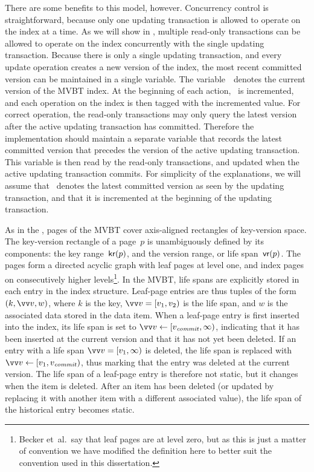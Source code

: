 There are some benefits to this model, however.
Concurrency control is straightforward, because only one updating
transaction is allowed to operate on the index at a time.
As we will show in , multiple read-only
transactions can be allowed to operate on the index concurrently with the
single updating transaction.
Because there is only a single updating transaction, and every update
operation creates a new version of the index, the most recent committed
version can be maintained in a single variable.
The variable~\comver\ denotes the current version of the MVBT index.
At the beginning of each action, \comver\ is incremented, and each operation
on the index is then tagged with the incremented value.
For correct operation, the read-only transactions may only query the
latest version after the active updating transaction has committed.
Therefore the implementation should maintain a separate variable that records
the latest committed version that precedes the version of the active updating
transaction. 
This variable is then read by the read-only transactions, and updated when
the active updating transaction commits. 
For simplicity of the explanations, we will assume that \comver\ denotes the
latest committed version as seen by the updating transaction, and that it is 
incremented at the beginning of the updating transaction.

As in the \TSBtree, pages of the MVBT cover axis-aligned rectangles of
key-version space.
The key-version rectangle of a page~$p$ is unambiguously defined by its
components: the key range~$\text{\textsf{kr}}(p)$\label{def:kr}, and
the version range, or life span~$\text{\textsf{vr}}(p)$\label{def:vr}.
The pages form a directed acyclic graph with leaf pages at level one, and
index pages on consecutively higher levels\footnote{Becker et~al.\ say that
leaf pages are at level zero, but as this is just a matter of convention we
have modified the definition here to better suit the convention used in this
dissertation.}.
In the MVBT, life spans are explicitly stored in each entry in the index
structure.
Leaf-page entries are thus tuples of the form $(k, \vrmark{v}, w)$, where 
$k$ is the key, $\vrmark{v} = [v_1, v_2)$ is the life span, and $w$ is the
associated data stored in the data item.
When a leaf-page entry is first inserted into the index, its life span is set
to $\vrmark{v} \leftarrow [\comver, \infty)$, indicating that it has been
inserted at the current version and that it has not yet been deleted.
If an entry with a life span $\vrmark{v} = [v_1, \infty)$ is deleted, the
life span is replaced with $\vrmark{v} \leftarrow [v_1, \comver)$, thus
marking that the entry was deleted at the current version.
The life span of a leaf-page entry is therefore not static, but it changes
when the item is deleted.
After an item has been deleted (or updated by replacing it with another
item with a different associated value), the life span of the historical
entry becomes static.

